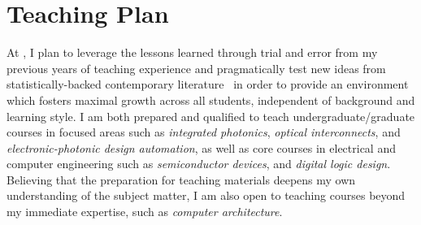 \section*{Teaching Plan}
At \appSchoolShort{}, I plan to leverage the lessons learned through trial and error from my previous years of teaching experience and pragmatically test new ideas from statistically-backed contemporary literature~\cite{deslauriersMeasuringActualLearning2019,bathgatePerceivedSupportsEvidencebased2019} in order to provide an environment which fosters maximal growth across all students, independent of background and learning style. I am both prepared and qualified to teach undergraduate/graduate
courses in focused areas such as \emph{integrated photonics}, \emph{optical interconnects}, and \emph{electronic-photonic design automation}, as well as core courses in electrical and computer engineering such as \emph{semiconductor devices}, and \emph{digital logic design}. Believing that the preparation for teaching materials deepens my own understanding of the subject matter, I am also open to teaching courses beyond my immediate expertise, such as \emph{computer architecture}.